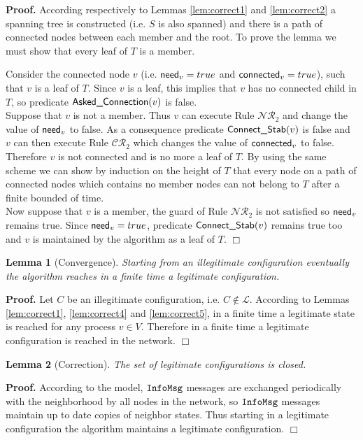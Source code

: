 \documentclass[11pt]{article}
\newtheorem{lemma}{Lemma}
\newenvironment{proof}{\noindent \begin{rm}{\textbf{Proof.} }}{\hspace*{\fill}$\Box$\par\end{rm} \vspace{.3cm}}
\newcommand{\InfoMsg}{\mbox{\tt InfoMsg}}
\newcommand{\need}{\mbox{\sf need}}
\newcommand{\connect}{\mbox{\sf connected}}
\newcommand{\Ask}{\mbox{\sf Asked\_Connection}}
\newcommand{\ConnectS}{\mbox{\sf Connect\_Stab}}
\newcommand{\CRC}{$\mathcal{NR}_2$}
\newcommand{\CRE}{$\mathcal{CR}_2$}
\begin{document}
\begin{proof}
According respectively to Lemmas \ref{lem:correct1} and
\ref{lem:correct2} a spanning tree is constructed (i.e. $S$ is also
spanned) and there is a path of connected nodes between each member
and the root. To prove the lemma we must show that every leaf of $T$
is a member.

Consider the connected node $v$ (i.e. $\need_v=true$ and
$\connect_v=true$), such that $v$ is a leaf of $T$. Since $v$ is a
leaf, this implies that $v$ has no connected child in $T$, so
predicate $\Ask(v)$ is false.\\ Suppose that $v$ is not a
member. Thus $v$ can execute Rule \CRC\/ and change the value of
$\need_v$ to false. As a consequence predicate $\ConnectS(v)$
is false and $v$ can then execute Rule \CRE\/ which changes the value of
$\connect_v$ to false. Therefore $v$ is not connected and is no more
a leaf of $T$. By using the same scheme we can show by induction on
the height of $T$ that every node on a path of connected nodes which
contains no member nodes can not belong to $T$ after a finite bounded
of time.\\ Now suppose that $v$ is a member, the guard of Rule \CRC\/ is
not satisfied so $\need_v$ remains true. Since $\need_v=true$, predicate
$\ConnectS(v)$ remains true too and $v$ is maintained by the
algorithm as a leaf of $T$.
\end{proof}

\begin{lemma}[Convergence]
\label{lem:convergence}
Starting from an illegitimate configuration eventually the algorithm reaches in a finite time a legitimate
configuration.
\end{lemma}

\begin{proof}
Let $C$ be an illegitimate configuration, i.e. $C \not \in
\mathcal{L}$. According to Lemmas \ref{lem:correct1},
\ref{lem:correct4} and \ref{lem:correct5}, in a finite time a
legitimate state is reached for any process $v \in V$. Therefore in a
finite time a legitimate configuration is reached in the network.
\end{proof}

\begin{lemma}[Correction]
The set of legitimate configurations is closed.
\end{lemma}

\begin{proof}
According to the model, $\InfoMsg$ messages are exchanged periodically
with the neighborhood by all nodes in the network, so $\InfoMsg$
messages maintain up to date copies of neighbor states. Thus starting
in a legitimate configuration the algorithm maintains a legitimate
configuration.
\end{proof}
\end{document}
